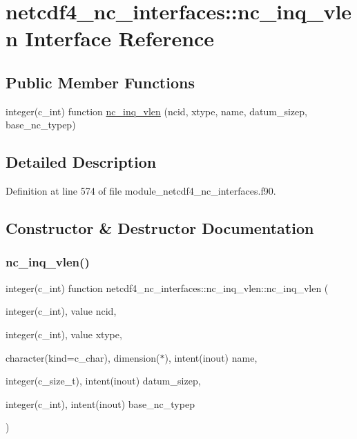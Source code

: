 \hypertarget{interfacenetcdf4__nc__interfaces_1_1nc__inq__vlen}{}\section{netcdf4\+\_\+nc\+\_\+interfaces\+:\+:nc\+\_\+inq\+\_\+vlen Interface Reference}
\label{interfacenetcdf4__nc__interfaces_1_1nc__inq__vlen}
\subsection*{Public Member Functions}
\begin{DoxyCompactItemize}
\item 
integer(c\+\_\+int) function \hyperlink{interfacenetcdf4__nc__interfaces_1_1nc__inq__vlen_a20a122dea0b2349c1e91528df41ae940}{nc\+\_\+inq\+\_\+vlen} (ncid, xtype, name, datum\+\_\+sizep, base\+\_\+nc\+\_\+typep)
\end{DoxyCompactItemize}


\subsection{Detailed Description}


Definition at line 574 of file module\+\_\+netcdf4\+\_\+nc\+\_\+interfaces.\+f90.



\subsection{Constructor \& Destructor Documentation}
\mbox{\label{interfacenetcdf4__nc__interfaces_1_1nc__inq__vlen_a20a122dea0b2349c1e91528df41ae940}} 
\subsubsection{\texorpdfstring{nc\+\_\+inq\+\_\+vlen()}{nc\_inq\_vlen()}}
{\footnotesize\ttfamily integer(c\+\_\+int) function netcdf4\+\_\+nc\+\_\+interfaces\+::nc\+\_\+inq\+\_\+vlen\+::nc\+\_\+inq\+\_\+vlen (\begin{DoxyParamCaption}\item[{integer(c\+\_\+int), value}]{ncid,  }\item[{integer(c\+\_\+int), value}]{xtype,  }\item[{character(kind=c\+\_\+char), dimension($\ast$), intent(inout)}]{name,  }\item[{integer(c\+\_\+size\+\_\+t), intent(inout)}]{datum\+\_\+sizep,  }\item[{integer(c\+\_\+int), intent(inout)}]{base\+\_\+nc\+\_\+typep }\end{DoxyParamCaption})}



